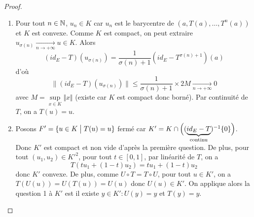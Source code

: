 \begin{proof}
	\phantom{}
	\begin{enumerate}
		\item Pour tout $n\in\mathbb{N}$, $u_{n}\in K$ car $u_{n}$ est le barycentre de $(a,T(a),\dots,T^{n}(a))$ et $K$ est convexe. Comme $K$ est compact, on peut extraire $u_{\sigma(n)}\xrightarrow[n\to+\infty]{}u\in K$. Alors
		\begin{equation}(id_{E}-T)(u_{\sigma(n)})=\frac{1}{\sigma(n)+1}(id_{E}-T^{\sigma(n)+1})(a)\end{equation}
		d'où 
		\begin{equation}\rVert(id_{E}-T)(u_{\sigma(n)})\lVert\leqslant\frac{1}{\sigma(n)+1}\times 2M\xrightarrow[n\to+\infty]{}0\end{equation}
		avec $M=\sup\limits_{x\in K}\Vert x\Vert$ (existe car $K$ est compact donc borné). Par continuité de $T$, on a $T(u)=u$.

		\item Posons $F'=\{u\in K\bigm| T(u)=u\}$ fermé car $K'=K\cap\Bigl((\underbrace{id_{E}-T}_{\text{continu}})^{-1}\{0\}\Bigr)$.
		Donc $K'$ est compact et non vide d'après la première question. De plus, pour tout $(u_{1},u_{2})\in K'^{2}$, pour tout $t\in[0,1]$, par linéarité de $T$, on a 
		\begin{equation}T(tu_{1}+(1-t)u_{2})=tu_{1}+(1-t)u_{2}\end{equation}
		donc $K'$ convexe. De plus, comme $U\circ T=T\circ U$, pour tout $u\in K'$, on a $T(U(u))=U(T(u))=U(u)$ donc $U(u)\in K'$. On applique alors la question 1 à $K'$ est il existe $y\in K'\colon U(y)=y$ et $T(y)=y$.
	\end{enumerate}
\end{proof}

